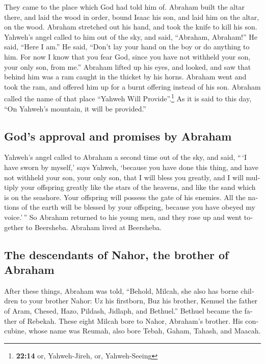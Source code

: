 \begin{paracol}{2}
\begin{otherlanguage}{english}
 They came to the place which God had told him of. Abraham
built the altar there, and laid the wood in order, bound Isaac his son,
and laid him on the altar, on the wood.  Abraham
stretched out his hand, and took the knife to kill his son.
 Yahweh's angel called to him out of the sky, and said,
``Abraham, Abraham!'' He said, ``Here I am.''  He said,
``Don't lay your hand on the boy or do anything to him. For now I know
that you fear God, since you have not withheld your son, your only son,
from me.''  Abraham lifted up his eyes, and looked, and
saw that behind him was a ram caught in the thicket by his horns.
Abraham went and took the ram, and offered him up for a burnt offering
instead of his son.  Abraham called the name of that
place ``Yahweh Will Provide''.\footnote{\textbf{22:14} or, Yahweh-Jireh,
  or, Yahweh-Seeing} As it is said to this day, ``On Yahweh's mountain,
it will be provided.''

\hypertarget{gods-approval-and-promises-by-abraham}{%
\subsection{God's approval and promises by
Abraham}\label{gods-approval-and-promises-by-abraham}}

 Yahweh's angel called to Abraham a second time out of
the sky,  and said, ``\,`I have sworn by myself,' says
Yahweh, `because you have done this thing, and have not withheld your
son, your only son,  that I will bless you greatly, and I
will multiply your offspring greatly like the stars of the heavens, and
like the sand which is on the seashore. Your offspring will possess the
gate of his enemies.  All the nations of the earth will
be blessed by your offspring, because you have obeyed my voice.'\,''
 So Abraham returned to his young men, and they rose up
and went together to Beersheba. Abraham lived at Beersheba.

\hypertarget{the-descendants-of-nahor-the-brother-of-abraham}{%
\subsection{The descendants of Nahor, the brother of
Abraham}\label{the-descendants-of-nahor-the-brother-of-abraham}}

 After these things, Abraham was told, ``Behold, Milcah,
she also has borne children to your brother Nahor:  Uz
his firstborn, Buz his brother, Kemuel the father of Aram,
 Chesed, Hazo, Pildash, Jidlaph, and Bethuel.''
 Bethuel became the father of Rebekah. These eight Milcah
bore to Nahor, Abraham's brother.  His concubine, whose
name was Reumah, also bore Tebah, Gaham, Tahash, and Maacah.


\end{otherlanguage}
\end{paracol}
